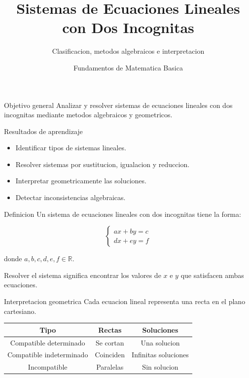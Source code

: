 \documentclass[aspectratio=169]{beamer}
\title[Sistemas lineales]{Sistemas de Ecuaciones Lineales con Dos Incognitas}
\subtitle{Clasificacion, metodos algebraicos e interpretacion}
\author{Fundamentos de Matematica Basica}
\institute{Universidad Santo Tomas}
\date{}
\begin{document}
	
	\begin{frame}
		\titlepage
	\end{frame}
	
	\begin{frame}{Objetivo general}
		Analizar y resolver sistemas de ecuaciones lineales con dos incognitas mediante metodos algebraicos y geometricos.
		
		\begin{block}{Resultados de aprendizaje}
			\begin{itemize}
				\item Identificar tipos de sistemas lineales.
				\item Resolver sistemas por sustitucion, igualacion y reduccion.
				\item Interpretar geometricamente las soluciones.
				\item Detectar inconsistencias algebraicas.
			\end{itemize}
		\end{block}
	\end{frame}
	
	\begin{frame}{Definicion}
		Un sistema de ecuaciones lineales con dos incognitas tiene la forma:
		
		\[
		\begin{cases}
			ax+by=c\\
			dx+ey=f
		\end{cases}
		\]
		
		donde \(a,b,c,d,e,f \in \mathbb{R}\).
		
		\bigskip
		
		Resolver el sistema significa encontrar los valores de \(x\) e \(y\) que satisfacen ambas ecuaciones.
	\end{frame}
	
	\begin{frame}{Interpretacion geometrica}
		Cada ecuacion lineal representa una recta en el plano cartesiano.
		
		\bigskip
		
		\begin{center}
			\begin{tabular}{|c|c|c|}
				\hline
				\textbf{Tipo} & \textbf{Rectas} & \textbf{Soluciones} \\
				\hline
				Compatible determinado & Se cortan & Una solucion \\
				\hline
				Compatible indeterminado & Coinciden & Infinitas soluciones \\
				\hline
				Incompatible & Paralelas & Sin solucion \\
				\hline
			\end{tabular}
		\end{center}
	\end{frame}
	
\end{document}
